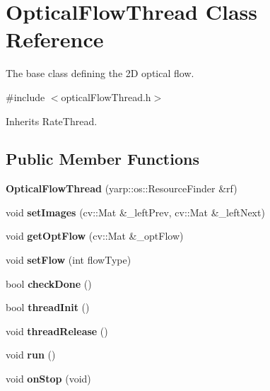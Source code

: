 \section{Optical\+Flow\+Thread Class Reference}
\label{classOpticalFlowThread}


The base class defining the 2D optical flow.  




{\ttfamily \#include $<$optical\+Flow\+Thread.\+h$>$}



Inherits Rate\+Thread.

\subsection*{Public Member Functions}
\begin{DoxyCompactItemize}
\item 
{\bfseries Optical\+Flow\+Thread} (yarp\+::os\+::\+Resource\+Finder \&rf)\label{classOpticalFlowThread_a2d90f6c196cc33c7d81ec35468896c8c}

\item 
void {\bfseries set\+Images} (cv\+::\+Mat \&\+\_\+left\+Prev, cv\+::\+Mat \&\+\_\+left\+Next)\label{classOpticalFlowThread_a6c04e7a9e28e792ff5d81f65ae11d67a}

\item 
void {\bfseries get\+Opt\+Flow} (cv\+::\+Mat \&\+\_\+opt\+Flow)\label{classOpticalFlowThread_ab052e551a0ad2f625b72661d9e8a2289}

\item 
void {\bfseries set\+Flow} (int flow\+Type)\label{classOpticalFlowThread_a2819e22da7950422f51f6331485468cf}

\item 
bool {\bfseries check\+Done} ()\label{classOpticalFlowThread_a8b201fe043a596728a9925bce91b2846}

\item 
bool {\bfseries thread\+Init} ()\label{classOpticalFlowThread_aecc4312f7a794c9668dd2e8bb6099939}

\item 
void {\bfseries thread\+Release} ()\label{classOpticalFlowThread_a90234a9a3f4aa898413cfb36aac4a979}

\item 
void {\bfseries run} ()\label{classOpticalFlowThread_a0329bf989f05e6715bbaccde904fe88f}

\item 
void {\bfseries on\+Stop} (void)\label{classOpticalFlowThread_ac30f26065348c602f160421aa69a7ed3}

\end{DoxyCompactItemize}


